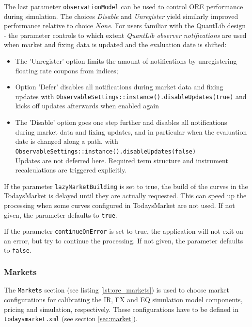 \documentclass[12pt, a4paper]{article}
\begin{document}
{\medskip The last parameter {\tt observationModel} can be used to control ORE performance during simulation. The choices
{\em Disable } and {\em Unregister } yield similarly improved performance relative to choice {\em None}. For users
familiar with the QuantLib design - the parameter controls to which extent {\em QuantLib observer notifications} are
used when market and fixing data is updated and the evaluation date is shifted:
\begin{itemize}
\item The 'Unregister' option limits the amount of notifications by unregistering floating rate coupons from indices;
\item Option 'Defer' disables all notifications during market data and fixing updates with
{\tt ObservableSettings::instance().disableUpdates(true)}
and kicks off updates afterwards when enabled again
\item The 'Disable' option goes one step further and disables all notifications during market data and fixing updates,
  and in particular when the evaluation date is changed along a path, with \\
  {\tt ObservableSettings::instance().disableUpdates(false)} \\
  Updates are not deferred here. Required term structure and instrument recalculations are triggered explicitly.
\end{itemize}

\medskip If the parameter {\tt lazyMarketBuilding} is set to true, the build of the curves in the TodaysMarket is
delayed until they are actually requested. This can speed up the processing when some curves configured in TodaysMarket
are not used. If not given, the parameter defaults to {\tt true}.

\medskip If the parameter {\tt continueOnError} is set to true, the application will not exit on an error, but try to
continue the processing. If not given, the parameter defaults to {\tt false}.

\subsubsection{Markets}\label{sec:master_input_markets}

The {\tt Markets} section (see listing \ref{lst:ore_markets}) is used to choose market configurations for calibrating
the IR, FX and EQ simulation model components, pricing and simulation, respectively. These configurations have to be 
defined
in {\tt todaysmarket.xml} (see section \ref{sec:market}).

}
\end{document}
